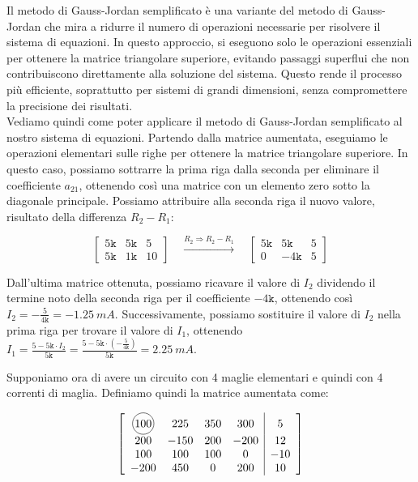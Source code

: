 Il metodo di Gauss-Jordan semplificato è una variante del metodo di Gauss-Jordan che mira a ridurre il numero di operazioni necessarie per risolvere il sistema di equazioni. In questo approccio, si eseguono solo le operazioni essenziali per ottenere la matrice triangolare superiore, evitando passaggi superflui che non contribuiscono direttamente alla soluzione del sistema. Questo rende il processo più efficiente, soprattutto per sistemi di grandi dimensioni, senza compromettere la precisione dei risultati.\\

Vediamo quindi come poter applicare il metodo di Gauss-Jordan semplificato al nostro sistema di equazioni. Partendo dalla matrice aumentata, eseguiamo le operazioni elementari sulle righe per ottenere la matrice triangolare superiore. In questo caso, possiamo sottrarre la prima riga dalla seconda per eliminare il coefficiente $a_{21}$, ottenendo così una matrice con un elemento zero sotto la diagonale principale. 
Possiamo attribuire alla seconda riga il nuovo valore, risultato della differenza $R_2 - R_1$:

\begin{equation}
\left[
\begin{array}{cc|c}
5\texttt{k} & 5\texttt{k} & 5 \\
5\texttt{k} & 1\texttt{k} & 10
\end{array}
\right]
\quad \xrightarrow{R_2 \Rightarrow R_2 - R_1} \quad
\left[
\begin{array}{cc|c}
5\texttt{k} & 5\texttt{k} & 5 \\
0 & -4\texttt{k} & 5
\end{array}
\right]
\end{equation}

Dall'ultima matrice ottenuta, possiamo ricavare il valore di $I_2$ dividendo il termine noto della seconda riga per il coefficiente $-4\texttt{k}$, ottenendo così $I_2 = -\frac{5}{4\texttt{k}} = \SI{-1.25}{mA}$. Successivamente, possiamo sostituire il valore di $I_2$ nella prima riga per trovare il valore di $I_1$, ottenendo $I_1 = \frac{5 - 5\texttt{k} \cdot I_2}{5\texttt{k}} = \frac{5 - 5\texttt{k} \cdot (-\frac{5}{4\texttt{k}})}{5\texttt{k}} = \SI{2.25}{mA}$.

Supponiamo ora di avere un circuito con 4 maglie elementari e quindi con 4 correnti di maglia. Definiamo quindi la matrice aumentata come:

\begin{equation}
	\left[
		\begin{array}{c c c c | c}
		\tikz[baseline=(char.base)]{\node[draw,circle,inner sep=1pt] (char) {100};} & 225 & 350 & 300 & 5 \\
		200 & -150 & 200 & -200 & 12 \\
		100 & 100 & 100 & 0 & -10 \\
		-200 & 450 & 0 & 200 & 10 
		\end{array}
	\right]
	\label{mat: 4 ord aumentata}
\end{equation}


